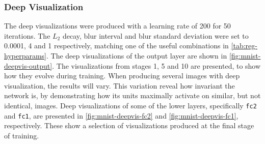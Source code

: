 \subsubsection{Deep Visualization}

The deep visualizations were produced with a learning rate of 200 for 50 iterations. The $L_2$ decay, blur interval and blur standard deviation were set to 0.0001, 4 and 1 respectively, matching one of the useful combinations in \autoref{tab:reg-hyperparams}. The deep visualizations of the output layer are shown in \autoref{fig:mnist-deepvis-output}. The visualizations from stages 1, 5 and 10 are presented, to show how they evolve during training. When producing several images with deep visualization, the results will vary. This variation reveal how invariant the network is, by demonstrating how its units maximally activate on similar, but not identical, images. Deep visualizations of some of the lower layers, specifically \texttt{fc2} and \texttt{fc1}, are presented in \autoref{fig:mnist-deepvis-fc2} and \autoref{fig:mnist-deepvis-fc1}, respectively. These show a selection of visualizations produced at the final stage of training.

